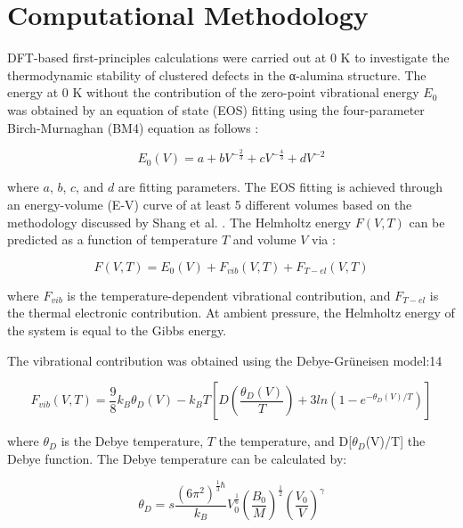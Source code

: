 \section{Computational Methodology}

DFT-based first-principles calculations were carried out at 0 K to investigate the thermodynamic stability of clustered defects in the α-alumina structure. The energy at 0 K without the contribution of the zero-point vibrational energy $E_{0}$ was obtained by an equation of state (EOS) fitting using the four-parameter Birch-Murnaghan (BM4) equation as follows \cite{Shang2010}:

\begin{equation}
\label{Ch3-eq: EOS}
E_{0}(V) = a + bV^{- \frac{2}{3}} + cV^{- \frac{4}{3}} + dV^{-2}
\end{equation}

\noindent where $a$, $b$, $c$, and $d$ are fitting parameters. The EOS fitting is achieved through an energy-volume (E-V) curve of at least 5 different volumes based on the methodology discussed by Shang et al. \cite{Shang2010}. The Helmholtz energy $F(V,T)$ can be predicted as a function of temperature $T$ and volume $V$ via \cite{Shang2010,Wang2004}:

\begin{equation}
\label{Ch3-eq: helmholtz}
F(V,T) = E_{0}(V) + F_{vib}(V,T) + F_{T-el}(V,T)
\end{equation}

\noindent where $F_{vib}$ is the temperature-dependent vibrational contribution, and $F_{T-el}$ is the thermal electronic contribution. At ambient pressure, the Helmholtz energy of the system is equal to the Gibbs energy. 

The vibrational contribution was obtained using the Debye-Gr\"uneisen model:14 

\begin{equation}
\label{Ch3-eq: Fvib}
F_{vib}(V,T) = \frac{9}{8} k_{B} \theta_{D}(V) - k_{B}T \left [D\left( \frac{\theta_{D} (V)}{T} \right) + 3 ln \left(1-e^{-\theta_{D}(V)/T} \right) \right]
\end{equation}

\noindent where $\theta_{D}$ is the Debye temperature, $T$ the temperature, and D[$\theta_{D}$(V)/T] the Debye function. The Debye temperature can be calculated by: 

\begin{equation}
\label{Ch3-eq: debyetT}
\theta_{D} = s \frac{(6\pi^{2})^{\frac{1}{3} \hbar}}{k_{B}} V_{0}^{\frac{1}{6}} \left(\frac{B_{0}}{M} \right)^{\frac{1}{2}} \left(\frac{V_{0}}{V} \right)^{\gamma}
\end{equation}

